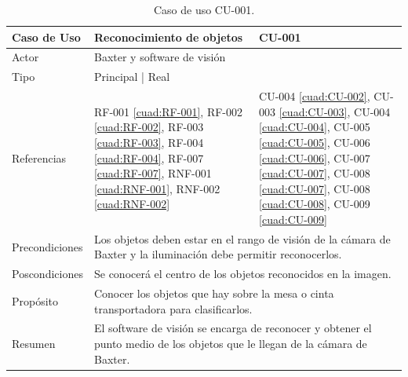 \begin{table}[H]
	\centering
	\begin{tabular}{|p{2.5cm} | p{6cm} | p{5cm} |}
		\hline
		\textbf{Caso de Uso} & Reconocimiento de objetos & \textbf{CU-001} \\
		\hline 
		Actor & \multicolumn{2}{|l|}{Baxter y software de visión} \\
		\hline
		Tipo & \multicolumn{2}{|l|}{Principal | Real} \\
		\hline
		Referencias & RF-001 \ref{cuad:RF-001}, RF-002 \ref{cuad:RF-002}, RF-003 \ref{cuad:RF-003}, RF-004 \ref{cuad:RF-004}, RF-007 \ref{cuad:RF-007}, RNF-001 \ref{cuad:RNF-001}, RNF-002 \ref{cuad:RNF-002} & CU-004 \ref{cuad:CU-002}, CU-003 \ref{cuad:CU-003}, CU-004 \ref{cuad:CU-004}, CU-005 \ref{cuad:CU-005}, CU-006 \ref{cuad:CU-006}, CU-007 \ref{cuad:CU-007}, CU-008 \ref{cuad:CU-007}, CU-008 \ref{cuad:CU-008}, CU-009 \ref{cuad:CU-009} \\
		\hline
		Precondiciones & \multicolumn{2}{|l|}{\parbox{30em}{Los objetos deben estar en el rango de visión de la cámara de Baxter y la iluminación debe permitir reconocerlos.}} \\
		\hline
		Poscondiciones & \multicolumn{2}{|l|}{Se conocerá el centro de los objetos reconocidos en la imagen.}\\
		\hline
		Propósito & \multicolumn{2}{|l|}{\parbox{30em}{Conocer los objetos que hay sobre la mesa o cinta transportadora para clasificarlos.}} \\
		\hline
		Resumen & \multicolumn{2}{|l|}{\parbox{30em}{El software de visión se encarga de reconocer y obtener el punto medio de los objetos que le llegan de la cámara de Baxter.}} \\
		\hline
		
	\end{tabular}
	\caption{Caso de uso CU-001.}
	\label{cuad:CU-001}
\end{table}


